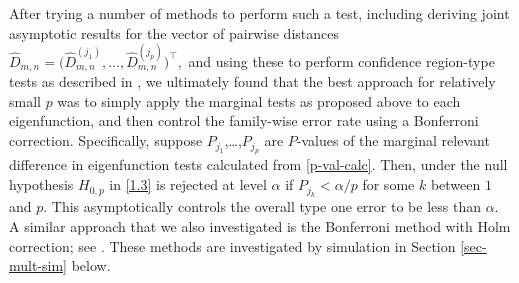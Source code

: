 \documentclass[11pt]{article}
\numberwithin{equation}{section}
\numberwithin{theorem}{section}
\numberwithin{lemma}{section}
\numberwithin{proposition}{section}
\numberwithin{cor}{section}
\numberwithin{definition}{section}
\numberwithin{cons}{section}
\numberwithin{rem}{section}
\numberwithin{exa}{section}
\numberwithin{table}{section}
\numberwithin{figure}{section}
\numberwithin{algo}{section}
\begin{document}
{{After trying a number of methods to perform such a test, including deriving joint asymptotic results for the vector of  pairwise distances $\hat D_{m,n}   = \big (\hat  D^{(j_1)}_{m,n}, \ldots,   \hat D^{(j_p)}_{m,n}  \big )^\top,$  and using these to perform confidence region-type tests as described in \cite{aitchison1964}, we ultimately found that the best approach for relatively small $p$  was to simply apply the marginal tests as proposed above to each eigenfunction, and then control the family-wise error rate using a Bonferroni correction. Specifically, suppose $P_{j_1}$,\ldots,$P_{j_p}$ are $P$-values of the marginal relevant difference in eigenfunction tests calculated from \eqref{p-val-calc}.  Then, under the null hypothesis  $H_{0,p}$ in \eqref{1.3} is rejected at level $\alpha$ if $P_{j_k}<\alpha/p$ for some $k$ between $1$ and $p$. This asymptotically controls the overall type one error to be less than $\alpha$. A similar approach that we also investigated is the Bonferroni method with Holm correction; see \cite{holm:1979}. These methods are investigated by simulation in Section \ref{sec-mult-sim} below.

}}
\end{document}
